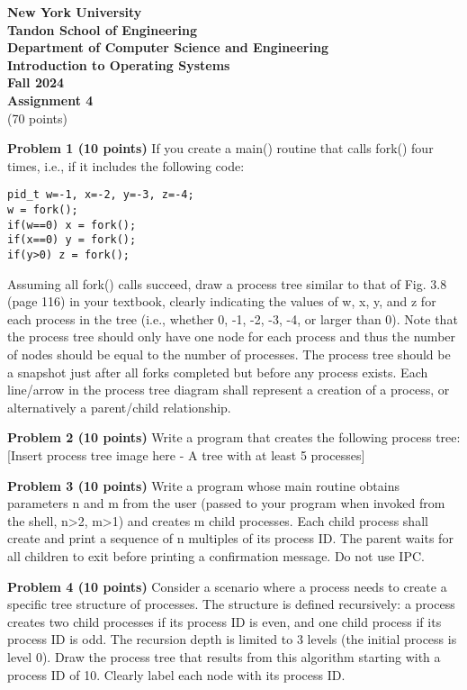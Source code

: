 \documentclass{article}
\begin{document}
\textbf{New York University} \\
\textbf{Tandon School of Engineering} \\
\textbf{Department of Computer Science and Engineering} \\
\textbf{Introduction to Operating Systems} \\
\textbf{Fall 2024} \\
\textbf{Assignment 4} \\
(70 points)

\textbf{Problem 1 (10 points)} If you create a main() routine that calls fork() four times, i.e., if it includes the following code:
\begin{verbatim}
pid_t w=-1, x=-2, y=-3, z=-4;
w = fork();
if(w==0) x = fork();
if(x==0) y = fork();
if(y>0) z = fork();
\end{verbatim}
Assuming all fork() calls succeed, draw a process tree similar to that of Fig. 3.8 (page 116) in your textbook, clearly indicating the values of w, x, y, and z for each process in the tree (i.e., whether 0, -1, -2, -3, -4, or larger than 0).
Note that the process tree should only have one node for each process and thus the number of nodes should be equal to the number of processes.
The process tree should be a snapshot just after all forks completed but before any process exists.
Each line/arrow in the process tree diagram shall represent a creation of a process, or alternatively a parent/child relationship.


\textbf{Problem 2 (10 points)} Write a program that creates the following process tree:
[Insert process tree image here -  A tree with at least 5 processes]


\textbf{Problem 3 (10 points)} Write a program whose main routine obtains parameters n and m from the user (passed to your program when invoked from the shell, n>2, m>1) and creates m child processes. Each child process shall create and print a sequence of n multiples of its process ID. The parent waits for all children to exit before printing a confirmation message. Do not use IPC.


\textbf{Problem 4 (10 points)}  Consider a scenario where a process needs to create a specific tree structure of processes.  The structure is defined recursively: a process creates two child processes if its process ID is even, and one child process if its process ID is odd. The recursion depth is limited to 3 levels (the initial process is level 0). Draw the process tree that results from this algorithm starting with a process ID of 10.  Clearly label each node with its process ID.
\end{document}
